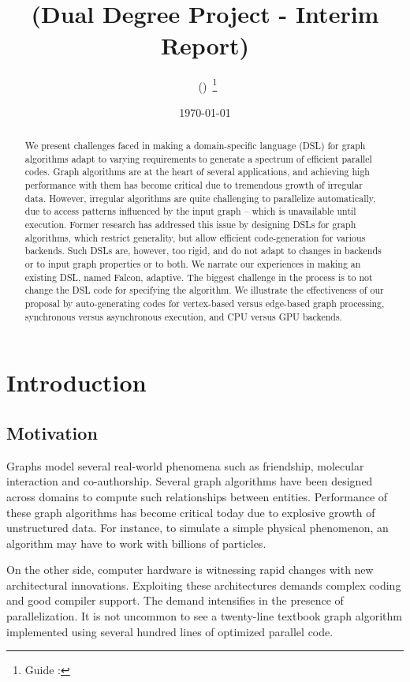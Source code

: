 \documentclass[12pt]{article}
\title{\reporttitle \\ {\small (Dual Degree Project - Interim Report)}}
\author{\reportauthor\ (\authorrollno)~\footnote{Guide : \guide}}
\date{\today}
\begin{document}
\maketitle

\begin{abstract}
We present challenges faced in making a domain-specific language (DSL) for graph algorithms adapt to varying requirements to generate a spectrum of efficient parallel codes. Graph algorithms are at the heart of several applications, and achieving high performance with them has become critical due to tremendous growth of irregular data. However, irregular algorithms are quite challenging to parallelize automatically, due to access patterns influenced by the input graph -- which is unavailable until execution. Former research has addressed this issue by designing DSLs for graph algorithms, which restrict generality, but allow efficient code-generation for various backends. Such DSLs are, however, too rigid, and do not adapt to changes in backends or to input graph properties or to both. We narrate our experiences in making an existing DSL, named Falcon, adaptive. The biggest challenge in the process is to not change the DSL code for specifying the algorithm. We illustrate the effectiveness of our proposal by auto-generating codes for vertex-based versus edge-based graph processing, synchronous versus asynchronous execution, and CPU versus GPU backends.
\end{abstract}

\tableofcontents

\section{Introduction} 
\subsection{Motivation}
Graphs model several real-world phenomena such as friendship, molecular interaction and co-authorship.
Several graph algorithms have been designed across domains to compute such relationships between entities.
Performance of these graph algorithms has become critical today due to explosive growth of unstructured data.
For instance, to simulate a simple physical phenomenon, an algorithm may have to work with billions of particles.

On the other side, computer hardware is witnessing rapid changes with new architectural innovations.
Exploiting these architectures demands complex coding and good compiler support.
The demand intensifies in the presence of parallelization.
It is not uncommon to see a twenty-line textbook graph algorithm implemented using several hundred lines of optimized parallel code.
\end{document}

